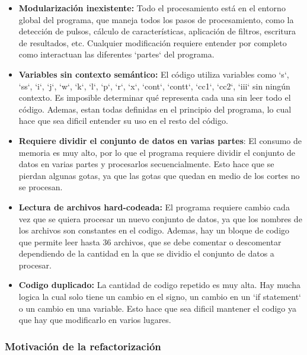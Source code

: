 \documentclass[12pt,a4paper]{article}
\begin{document}
\begin{itemize}

\item \textbf{Modularización inexistente:} Todo el procesamiento está en el entorno global del programa, que maneja todos los pasos de procesamiento, como la detección de pulsos, cálculo de características, aplicación de filtros, escritura de resultados, etc. Cualquier modificación requiere entender por completo como interactuan las diferentes `partes` del programa.

\item \textbf{Variables sin contexto semántico:} El código utiliza variables como `s`, `ss`, `i`,
`j`, `w`, `k`, `l`, `p`, `r`, `x`, `cont`, `contt`, `cc1`, `cc2`, `iii` sin ningún contexto. Es
imposible determinar qué representa cada una sin leer todo el código. Ademas, estan todas definidas en el principio del programa, lo cual hace que sea dificil entender su uso en el resto del código.
    
\item \textbf{Requiere dividir el conjunto de datos en varias partes}: El consumo de memoria es muy alto, por lo que el programa requiere dividir el conjunto de datos en varias partes y procesarlos secuencialmente. Esto hace que se pierdan algunas gotas, ya que las gotas que quedan en medio de los cortes no se procesan.

\item \textbf{Lectura de archivos hard-codeada:} El programa requiere cambio cada vez que se quiera procesar un nuevo conjunto de datos, ya que los nombres de los archivos son constantes en el codigo. Ademas, hay un bloque de codigo que permite leer hasta 36 archivos, que se debe comentar o descomentar dependiendo de la cantidad en la que se dividio el conjunto de datos a procesar.

\item \textbf{Codigo duplicado:} La cantidad de codigo repetido es muy alta. Hay mucha logica la cual solo tiene un cambio en el signo, un cambio en un `if statement` o un cambio en una variable. Esto hace que sea dificil mantener el codigo ya que hay que modificarlo en varios lugares.

\end{itemize}

\subsubsection{Motivación de la refactorización}
\end{document}
